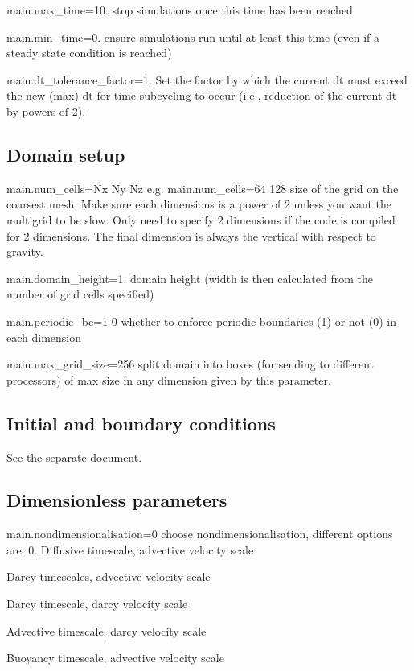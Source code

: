 {\ttfamily main.\+max\+\_\+time=10.} stop simulations once this time has been reached

{\ttfamily main.\+min\+\_\+time=0.} ensure simulations run until at least this time (even if a steady state condition is reached)

{\ttfamily main.\+dt\+\_\+tolerance\+\_\+factor=1.} Set the factor by which the current dt must exceed the new (max) dt for time subcycling to occur (i.\+e., reduction of the current dt by powers of 2).

\subsection*{Domain setup}

{\ttfamily main.\+num\+\_\+cells=Nx Ny Nz} e.\+g. {\ttfamily main.\+num\+\_\+cells=64 128} size of the grid on the coarsest mesh. Make sure each dimensions is a power of 2 unless you want the multigrid to be slow. Only need to specify 2 dimensions if the code is compiled for 2 dimensions. The final dimension is always the \textquotesingle{}vertical\textquotesingle{} with respect to gravity.

{\ttfamily main.\+domain\+\_\+height=1.} domain height (width is then calculated from the number of grid cells specified)

{\ttfamily main.\+periodic\+\_\+bc=1 0} whether to enforce periodic boundaries (1) or not (0) in each dimension

{\ttfamily main.\+max\+\_\+grid\+\_\+size=256} split domain into boxes (for sending to different processors) of max size in any dimension given by this parameter.

\subsection*{Initial and boundary conditions}

See the separate document.

\subsection*{Dimensionless parameters}

{\ttfamily main.\+nondimensionalisation=0} choose nondimensionalisation, different options are\+: 0. Diffusive timescale, advective velocity scale
\begin{DoxyEnumerate}
\item Darcy timescales, advective velocity scale
\item Darcy timescale, darcy velocity scale
\item Advective timescale, darcy velocity scale
\item Buoyancy timescale, advective velocity scale
\end{DoxyEnumerate}

